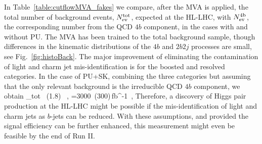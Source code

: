 In Table~\ref{table:cutflowMVA_fakes} we compare,
after the MVA is applied,
the total
number of background events, $N_{\rm ev}^{\rm tot}$,
    expected at the HL-LHC, with
     $N_{\rm ev}^{\rm 4b}$, the corresponding number
    from the QCD $4b$ component, in the cases with and without
    PU.
    The MVA has been trained to the total background sample,
    though differences
    in the kinematic distributions of the $4b$ and $2b2j$ processes are small,
    see Fig.~\ref{fig:histoBack}.
    The major improvement of eliminating the contamination
    of light and charm jet mis-identification is for the boosted and resolved categories.
%
    In the case of PU+SK, combining the three categories but assuming that
    the only relevant background is the irreducible QCD $4b$ component,
    we obtain
    \be
\lp {}\rp_{\rm tot} ~(1.8) \, ,\quad
{}=3000~(300)\,{\rm fb}^{-1}\, ,
\ee
Therefore, a discovery of Higgs pair production at the
HL-LHC might be possible if the
mis-identification of light and charm jets as
$b$-jets can be  reduced.
%
With these assumptions, and provided
the signal efficiency can be further enhanced,
this measurement might even be feasible
by the end of Run II.
%



